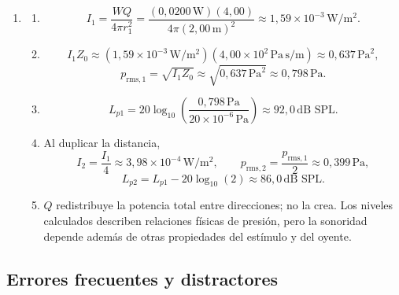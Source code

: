 \begin{enumerate}[label=\textbf{I\arabic*.},leftmargin=*]
    \item
    \begin{enumerate}[label=\alph*)]
        \item
        \[
            I_1
              =\frac{WQ}{4\pi r_1^2}
              =\frac{(0{,}0200\,\text{W})(4{,}00)}
                     {4\pi(2{,}00\,\text{m})^2}
              \approx1{,}59\times10^{-3}\,\text{W}/\text{m}^2.
        \]
        \item
        \[
            I_1Z_0
              \approx
              (1{,}59\times10^{-3}\,\text{W}/\text{m}^2)
              (4{,}00\times10^2\,
               \text{Pa}\,\text{s}/\text{m})
              \approx0{,}637\,\text{Pa}^2,
        \]
        \[
            p_{\mathrm{rms},1}
              =\sqrt{I_1Z_0}
              \approx\sqrt{0{,}637\,\text{Pa}^2}
              \approx0{,}798\,\text{Pa}.
        \]
        \item
        \[
            L_{p1}
              =20\log_{10}\!\left(
                \frac{0{,}798\,\text{Pa}}
                     {20\times10^{-6}\,\text{Pa}}\right)
              \approx92{,}0\,\text{dB SPL}.
        \]
        \item Al duplicar la distancia,
        \[
            I_2=\frac{I_1}{4}
              \approx3{,}98\times10^{-4}\,\text{W}/\text{m}^2,
            \qquad
            p_{\mathrm{rms},2}=\frac{p_{\mathrm{rms},1}}{2}
              \approx0{,}399\,\text{Pa},
        \]
        \[
            L_{p2}
              =L_{p1}-20\log_{10}(2)
              \approx86{,}0\,\text{dB SPL}.
        \]
        \item \(Q\) redistribuye la potencia total entre direcciones; no la
        crea. Los niveles calculados describen relaciones físicas de presión,
        pero la sonoridad depende además de otras propiedades del estímulo y
        del oyente.
    \end{enumerate}
\end{enumerate}

\subsection*{Errores frecuentes y distractores}

